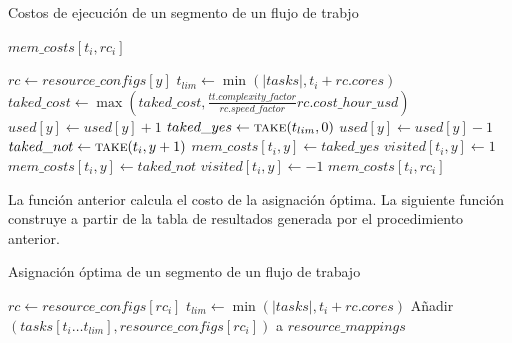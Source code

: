 \begin{algorithm}
\caption{Costos de ejecución de un segmento de un flujo de trabjo}
\begin{algorithmic}[1]
	\EndIf
		\State \Return $mem\_costs[t_i, rc_i]$
	\EndIf

		\State $rc \gets resource\_configs[y]$
		\State $t_{lim} \gets \min(|tasks|, t_i + rc.cores)$ 
		 
			\State $taked\_cost \gets \max(taked\_cost, \frac{tt.complexity\_factor}{rc.speed\_factor} rc.cost\_hour\_usd)$
		\EndFor
		\State $used[y] \gets used[y] + 1$
		\State $taked\_yes \gets \Call{take}{t_{lim}, 0}$
		\State $used[y] \gets used[y] - 1$
		\State $taked\_not \gets \Call{take}{t_i, y + 1}$
			\State $mem\_costs[t_i, y] \gets taked\_yes$
			\State $visited[t_i, y] \gets 1$
		\Else
			\State $mem\_costs[t_i, y] \gets taked\_not$
			\State $visited[t_i, y] \gets -1$
		\EndIf
	\EndFor
	\State \Return $mem\_costs[t_i, rc_i]$
\EndProcedure
\end{algorithmic}
\end{algorithm}

La función anterior calcula el costo de la asignación óptima. La siguiente función construye a partir de la tabla de resultados generada por el procedimiento anterior.

\begin{algorithm}
\caption{Asignación óptima de un segmento de un flujo de trabajo}
\begin{algorithmic}[1]
			\State $rc \gets resource\_configs[rc_i]$
			\State $t_{lim} \gets \min(|tasks|, t_i + rc.cores)$
			\State Añadir $(tasks[t_i \dots t_{lim}], resource\_configs[rc_i])$ a $resource\_mappings$
			\State {}
			\State {}	
		\EndIf
	\EndIf
\EndProcedure
\end{algorithmic}
\end{algorithm}

